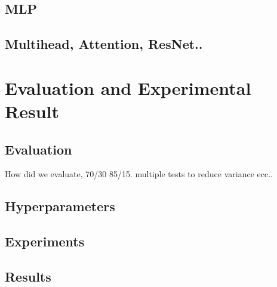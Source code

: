 \documentclass[12pt]{article}
\begin{document}
\subsection{MLP}
\subsection{Multihead, Attention, ResNet..}



\section{Evaluation and Experimental Result}
\subsection{Evaluation}
How did we evaluate, 70/30 85/15. multiple tests to reduce variance ecc..
\subsection{Hyperparameters}
\subsection{Experiments}
\subsection{Results}
\end{document}
